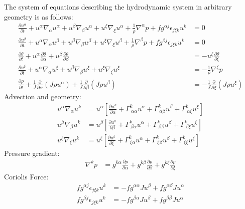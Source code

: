\documentclass{article}
\newcommand{\vb}{\mathbf}
\newcommand{\pdiff}[2]{\frac{\partial #1}{\partial #2}}
\begin{document}
The system of equations describing the hydrodynamic system in arbitrary geometry is as follows:
\begin{align}
\pdiff{u^\alpha}{t} + u^\alpha \nabla_\alpha u^\alpha + u^\beta \nabla_\beta u^\alpha + u^\xi \nabla_\xi u^\alpha + \frac{1}{\rho} \nabla^\alpha p + f g^{\alpha j} \epsilon_{j \xi k} u^k &= 0 \\
\pdiff{u^\beta}{t} + u^\alpha \nabla_\alpha u^\beta + u^\beta \nabla_\beta u^\beta + u^\xi \nabla_\xi u^\beta + \frac{1}{\rho} \nabla^\beta p + f g^{\beta j} \epsilon_{j \xi k} u^k &= 0 \\
\pdiff{\theta}{t} + u^\alpha \pdiff{\theta}{\alpha} + u^\beta \pdiff{\theta}{\beta} &= - u^\xi \pdiff{\theta}{\xi} \\
\pdiff{u^\xi}{t} + u^\alpha \nabla_\alpha u^\xi + u^\beta \nabla_\beta u^\xi + u^\xi \nabla_\xi u^\xi &= - \frac{1}{\rho} \nabla^\xi p \\
\pdiff{\rho}{t} + \frac{1}{J} \pdiff{}{\alpha} (J \rho u^\alpha) + \frac{1}{J} \pdiff{}{\beta} (J \rho u^\beta) &= - \frac{1}{J} \pdiff{}{\xi} (J \rho u^\xi)
\end{align}
Advection and geometry:
\begin{align}
u^\alpha \nabla_\alpha u^k &= u^\alpha \left[ \pdiff{u^k}{\alpha} + \Gamma^k_{\ \alpha \alpha} u^\alpha + \Gamma^k_{\ \alpha \beta} u^\beta + \Gamma^k_{\ \alpha \xi} u^\xi \right] \\
u^\beta \nabla_\beta u^k &= u^\beta \left[ \pdiff{u^k}{\beta} + \Gamma^k_{\ \beta \alpha} u^\alpha + \Gamma^k_{\ \beta \beta} u^\beta + \Gamma^k_{\ \beta \xi} u^\xi \right] \\
u^\xi \nabla_\xi u^k &= u^\xi \left[ \pdiff{u^k}{\xi} + \Gamma^k_{\ \xi \alpha} u^\alpha + \Gamma^k_{\ \xi \beta} u^\beta + \Gamma^k_{\ \xi \xi} u^\xi \right]
\end{align}
Pressure gradient:
\begin{align}
\nabla^k p &= g^{k \alpha} \pdiff{p}{\alpha} + g^{k \beta} \pdiff{p}{\beta} + g^{k \xi} \pdiff{p}{\xi}
\end{align}
Coriolis Force:
\begin{align}
f g^{\alpha j} \epsilon_{j \xi k} u^k &= - f g^{\alpha \alpha} J u^\beta + f g^{\alpha \beta} J u^\alpha \\
f g^{\beta j} \epsilon_{j \xi k} u^k &= - f g^{\beta \alpha} J u^\beta + f g^{\beta \beta} J u^\alpha
\end{align}

\end{document}
